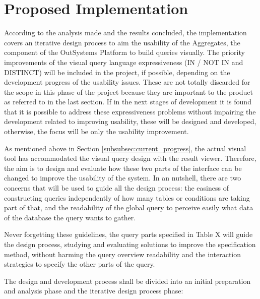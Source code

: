 \section{Proposed Implementation}
\label{sec:proposed_implementation}
According to the analysis made and the results concluded, the implementation covers an iterative design process to aim the usability of the Aggregates, the component of the OutSystems Platform to build queries visually. The priority improvements of the visual query language expressiveness (IN / NOT IN and DISTINCT) will be included in the project, if possible, depending on the development progress of the usability issues. These are not totally discarded for the scope in this phase of the project because they are important to the product as referred to in the last section. If in the next stages of development it is found that it is possible to address these expressiveness problems without impairing the development related to improving usability, these will be designed and developed, otherwise, the focus will be only the usability improvement.

As mentioned above in Section \ref{subsubsec:current_progress}, the actual visual tool has accommodated the visual query design with the result viewer. Therefore, the aim is to design and evaluate how these two parts of the interface can be changed to improve the usability of the system. In an nutshell, there are two concerns that will be used to guide all the design process: the easiness of constructing queries independently of how many tables or conditions are taking part of that, and the readability of the global query to perceive easily what data of the database the query wants to gather.

Never forgetting these guidelines, the query parts specified in Table X will guide the design process, studying and evaluating solutions to improve the specification method, without harming the query overview readability and the interaction strategies to specify the other parts of the query. 

The design and development process shall be divided into an initial preparation and analysis phase and the iterative design process phase:

